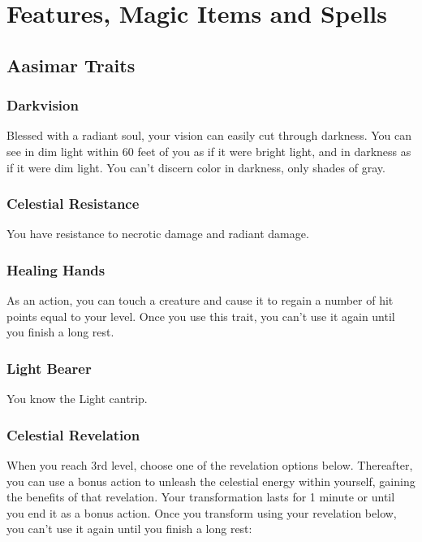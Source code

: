 \documentclass[letterpaper,openany,oneside,twocolumn]{book}
\begin{document}
\onecolumn


\rendercharactersheet

\renderbackgroundsheet

\renderspellsheet


\restoregeometry
\twocolumn

\chapter*{Features, Magic Items and Spells}

\section*{Aasimar Traits}
\subsection*{Darkvision}
Blessed with a radiant soul, your vision can easily cut through darkness. You can see in dim light within 60 feet of you as if it were bright light, and in darkness as if it were dim light. You can't discern color in darkness, only shades of gray.
\subsection*{Celestial Resistance}
You have resistance to necrotic damage and radiant damage.
\subsection*{Healing Hands}
As an action, you can touch a creature and cause it to regain a number of hit points equal to your level. Once you use this trait, you can't use it again until you finish a long rest.
\subsection*{Light Bearer}
You know the Light cantrip.
\subsection*{Celestial Revelation}
When you reach 3rd level, choose one of the revelation options below. Thereafter, you can use a bonus action to unleash the celestial energy within yourself, gaining the benefits of that revelation. Your transformation lasts for 1 minute or until you end it as a bonus action. Once you transform using your revelation below, you can't use it again until you finish a long rest:
\end{document}
